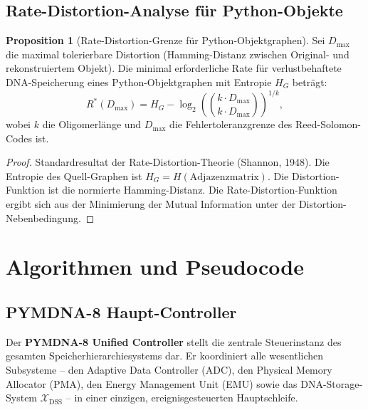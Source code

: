 ﻿\documentclass[a4paper,12pt]{article}
\theoremstyle{definition}
\newtheorem{proposition}{Proposition}[section]
\begin{document}
\subsection{Rate-Distortion-Analyse für Python-Objekte}

\begin{proposition}[Rate-Distortion-Grenze für Python-Objektgraphen]
  \label{prop:rate_distortion}
  Sei $D_{\mathrm{max}}$ die maximal tolerierbare Distortion
  (Hamming-Distanz zwischen Original- und rekonstruiertem Objekt).
  Die minimal erforderliche Rate für verlustbehaftete DNA-Speicherung
  eines Python-Objektgraphen mit Entropie $H_G$ beträgt:
  \begin{equation}
    R^*(D_{\mathrm{max}}) = H_G - \log_2
    \left(\binom{k \cdot D_{\mathrm{max}}}{k \cdot D_{\mathrm{max}}}\right)^{1/k},
  \end{equation}
  wobei $k$ die Oligomerlänge und $D_{\mathrm{max}}$ die
  Fehlertoleranzgrenze des Reed-Solomon-Codes ist.
\end{proposition}

\begin{proof}
  Standardresultat der Rate-Distortion-Theorie (Shannon, 1948).
  Die Entropie des Quell-Graphen ist $H_G = H(\text{Adjazenzmatrix})$.
  Die Distortion-Funktion ist die normierte Hamming-Distanz.
  Die Rate-Distortion-Funktion ergibt sich aus der Minimierung der
  Mutual Information unter der Distortion-Nebenbedingung.
\end{proof}

\section{Algorithmen und Pseudocode}

\subsection{PYMDNA-8 Haupt-Controller}

Der \textbf{PYMDNA-8 Unified Controller} stellt die zentrale Steuerinstanz des gesamten Speicherhierarchiesystems dar. Er koordiniert alle wesentlichen Subsysteme -- den Adaptive Data Controller (ADC), den Physical Memory Allocator (PMA), den Energy Management Unit (EMU) sowie das DNA-Storage-System $\mathcal{X}_{\mathrm{DSS}}$ -- in einer einzigen, ereignisgesteuerten Hauptschleife.
\end{document}
